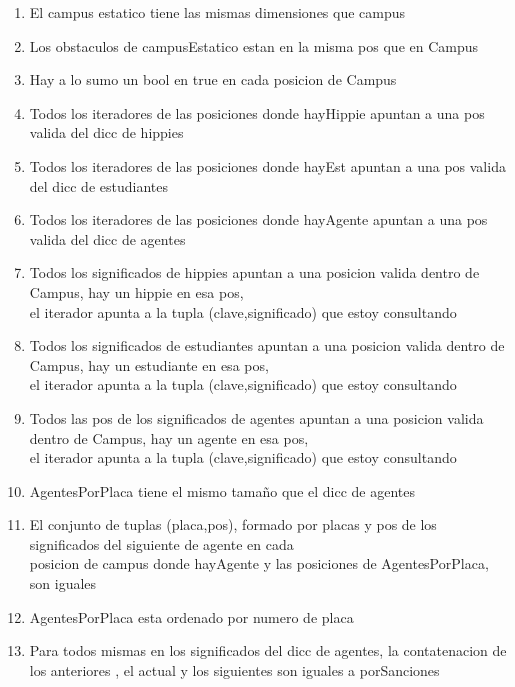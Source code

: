 \begin{enumerate}
  \item El campus estatico tiene las mismas dimensiones que campus
  \item Los obstaculos de campusEstatico estan en la misma pos que en Campus
  \item Hay a lo sumo un bool en true en cada posicion de Campus
  \item Todos los iteradores de las posiciones donde hayHippie apuntan a una pos valida del dicc de hippies
  \item Todos los iteradores de las posiciones donde hayEst apuntan a una pos valida del dicc de estudiantes
  \item Todos los iteradores de las posiciones donde hayAgente apuntan a una pos valida del dicc de agentes
  \item Todos los significados de hippies apuntan a una posicion valida dentro de Campus, hay un hippie en esa pos,
        \\el iterador apunta a la tupla (clave,significado) que estoy consultando
  \item Todos los significados de estudiantes apuntan a una posicion valida dentro de Campus, hay un estudiante en esa pos,
        \\el iterador apunta a la tupla (clave,significado) que estoy consultando
  \item Todos las pos de los significados de agentes apuntan a una posicion valida dentro de Campus, hay un agente en esa pos,
        \\el iterador apunta a la tupla (clave,significado) que estoy consultando
  \item AgentesPorPlaca tiene el mismo tamaño que el dicc de agentes
  \item El conjunto de tuplas (placa,pos), formado por  placas y pos de los significados del siguiente de agente en cada 
        \\posicion de campus donde hayAgente y las posiciones de AgentesPorPlaca, son iguales
  \item AgentesPorPlaca esta ordenado por numero de placa
  \item Para todos mismas en los significados del dicc de agentes, la contatenacion de los anteriores , el actual y los siguientes son iguales a porSanciones
  
\end{enumerate}

  \\

